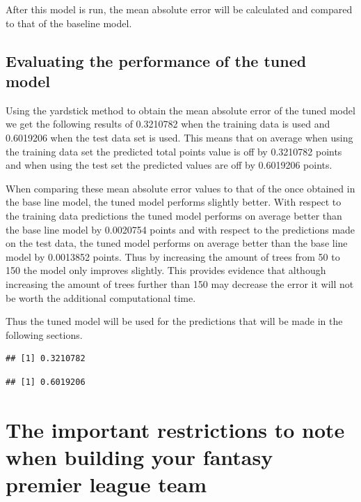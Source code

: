 \documentclass[11pt,preprint, authoryear]{elsarticle}
\numberwithin{equation}{section}
\numberwithin{figure}{section}
\numberwithin{table}{section}
\begin{document}
After this model is run, the mean absolute error will be calculated and
compared to that of the baseline model.

\hypertarget{evaluating-the-performance-of-the-tuned-model}{%
\subsection{Evaluating the performance of the tuned
model}\label{evaluating-the-performance-of-the-tuned-model}}

Using the yardstick method to obtain the mean absolute error of the
tuned model we get the following results of 0.3210782 when the training
data is used and 0.6019206 when the test data set is used. This means
that on average when using the training data set the predicted total
points value is off by 0.3210782 points and when using the test set the
predicted values are off by 0.6019206 points.

When comparing these mean absolute error values to that of the once
obtained in the base line model, the tuned model performs slightly
better. With respect to the training data predictions the tuned model
performs on average better than the base line model by 0.0020754 points
and with respect to the predictions made on the test data, the tuned
model performs on average better than the base line model by 0.0013852
points. Thus by increasing the amount of trees from 50 to 150 the model
only improves slightly. This provides evidence that although increasing
the amount of trees further than 150 may decrease the error it will not
be worth the additional computational time.

Thus the tuned model will be used for the predictions that will be made
in the following sections.

\begin{verbatim}
## [1] 0.3210782
\end{verbatim}

\begin{verbatim}
## [1] 0.6019206
\end{verbatim}

\hypertarget{the-important-restrictions-to-note-when-building-your-fantasy-premier-league-team}{%
\section{The important restrictions to note when building your fantasy
premier league
team}\label{the-important-restrictions-to-note-when-building-your-fantasy-premier-league-team}}
\end{document}
